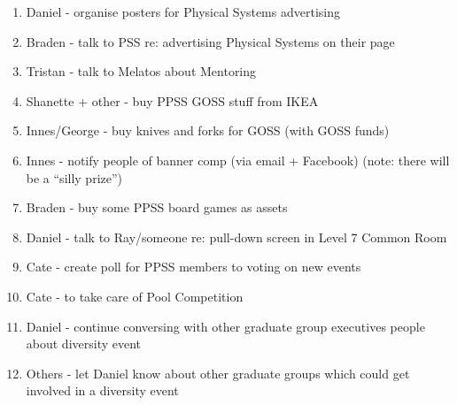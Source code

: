 \documentclass[a4paper,12pt]{article}
\begin{document}
\begin{enumerate}
\item Daniel - organise posters for Physical Systems advertising
\item Braden - talk to PSS re: advertising Physical Systems on their page
\item Tristan - talk to Melatos about Mentoring
\item Shanette + other - buy PPSS GOSS stuff from IKEA
\item Innes/George - buy knives and forks for GOSS (with GOSS funds)
\item Innes - notify people of banner comp (via email + Facebook) (note: there will be a ``silly prize'')
\item Braden - buy some PPSS board games as assets
\item Daniel - talk to Ray/someone re: pull-down screen in Level 7 Common Room
\item Cate - create poll for PPSS members to voting on new events
\item Cate - to take care of Pool Competition
\item Daniel - continue conversing with other graduate group executives people about diversity event
\item Others - let Daniel know about other graduate groups which could get involved in a diversity event
\end{enumerate}
\end{document}
